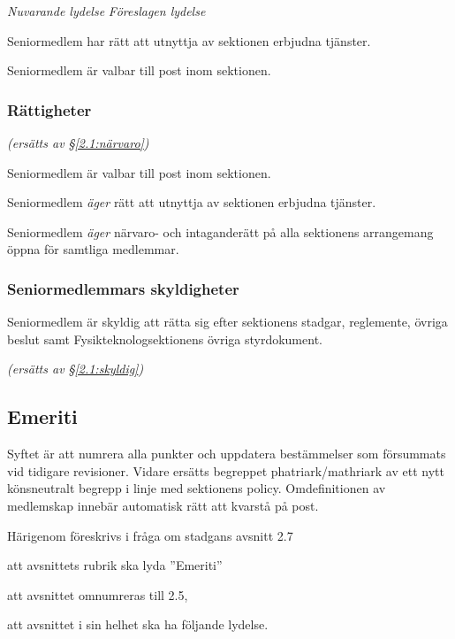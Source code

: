 \documentclass{article}
\newenvironment{lydelse}
    {\begin{paracol}{2}%
        \emph{Nuvarande lydelse}%
        \switchcolumn%
        \emph{Föreslagen lydelse}%
    \end{paracol}%
    \begin{enumerate}[label=\thesubsection.\arabic*]%
    \begin{paracol}{2}%
    }{\end{paracol}\end{enumerate}}
\newcommand{\itemb}{\item[\textbullet]}
\begin{document}
\begin{lydelse}
    \itemb Seniormedlem har rätt att utnyttja av sektionen erbjudna tjänster.
   
    \itemb Seniormedlem är valbar till post inom sektionen.
    
\switchcolumn
    \subsubsection*{Rättigheter}%
    \emph{(ersätts av \S \ref{2.1:närvaro})}
    
    \item Seniormedlem är valbar till post inom sektionen.
    
    \item Seniormedlem \emph{äger} rätt att utnyttja av sektionen erbjudna tjänster.
   
    \item Seniormedlem \emph{äger} närvaro- och intaganderätt på alla sektionens arrangemang öppna för samtliga medlemmar.

  \switchcolumn*
    \subsubsection*{Seniormedlemmars skyldigheter}%
    \itemb Seniormedlem är skyldig att rätta sig efter sektionens stadgar, regle\-mente, övriga beslut samt  Fysikteknologsektionens övriga styrdokument.
    
  \switchcolumn
    \emph{(ersätts av \S \ref{2.1:skyldig})}
\end{lydelse}

\subsection{Emeriti}
Syftet är att numrera alla punkter och uppdatera bestämmelser som försummats vid tidigare revisioner.
Vidare ersätts begreppet phatriark/mathriark av ett nytt könsneutralt begrepp i linje med sektionens policy.
Omdefinitionen av medlemskap innebär automatisk rätt att kvarstå på post.

Härigenom föreskrivs i fråga om stadgans avsnitt 2.7
\begin{dels}
    \item att avsnittets rubrik ska lyda ''Emeriti''
    \item att avsnittet omnumreras till 2.5,
    \item att avsnittet i sin helhet ska ha följande lydelse.
\end{dels}
\end{document}

